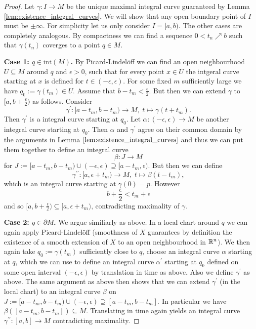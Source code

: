 \begin{proof}
Let $\gamma \colon I \to M$ be the unique maximal integral curve guaranteed by Lemma \ref{lem:existence_integral_curves}. We will show that any open boundary point of $I$ must be $\pm \infty$. For simplicity let us only consider $I = [a,b)$. The other cases are completely analogous. By compactness we can find a sequence $0 < t_n \nearrow b$ such that $\gamma(t_n)$ coverges to a point $q \in M$.

\noindent \textbf{Case 1: $q \in \mathrm{int}(M)$.} By Picard-Lindelöff we can find an open neighbourhood $U \subseteq M$ around $q$ and $\epsilon > 0$, such that for every point $x \in U$ the intgeral curve starting at $x$ is defined for $t \in (-\epsilon,\epsilon)$. For some fixed $m$ sufficiently large we have $q_0 := \gamma(t_m) \in U$. Assume that $b - t_m < \frac{\epsilon}{2}$. But then we can extend $\gamma$ to $[a,b + \frac{\epsilon}{2})$ as follows. Consider
\[
\gamma^\prime \colon [a-t_m,b-t_m) \to M, \; t \mapsto \gamma(t + t_m).
\]
Then $\gamma^\prime$ is a integral curve starting at $q_0$. Let $\alpha \colon (-\epsilon,\epsilon) \to M$ be another integral curve starting at $q_0$. Then $\alpha$ and $\gamma^\prime$ agree on their common domain by the arguments in Lemma $\ref{lem:existence_integral_curves}$ and thus we can put them together to define an integral curve 
\[
\beta \colon J \to M
\]
for $J := [a-t_m,b-t_m) \cup (-\epsilon,\epsilon) \supseteq [a-t_m,\epsilon)$. But then we can define
\[
\gamma^{\prime\prime} \colon [a,\epsilon + t_m) \to M, \; t \mapsto \beta(t-t_m),
\]
which is an integral curve starting at $\gamma(0) = p$. However
\[
b + \frac{\epsilon}{2} < t_m + \epsilon
\]
and so $[a,b + \frac{\epsilon}{2}) \subseteq [a,\epsilon + t_m)$, contradicting maximality of $\gamma$.

\noindent \textbf{Case 2: $q \in \partial M$.} We argue similiarly as above. In a local chart around $q$ we can again apply Picard-Lindelöff (smoothness of $X$ guarantees by definition the existence of a smooth extension of $X$ to an open neighbourhood in $\mathbb{R}^n$). We then again take $q_0 := \gamma(t_m)$ sufficiently close to $q$, choose an integral curve $\alpha$ starting at $q$, which we can use to define an integral curve $\alpha^\prime$ starting at $q_0$ defined on some open interval $(-\epsilon,\epsilon) $ by translation in time as above. Also we define $\gamma^\prime$ as above. The same argument as above then shows that we can extend $\gamma^\prime$ (in the local chart) to an integral curve $\beta$ on $J := [a-t_m,b-t_m) \cup (-\epsilon,\epsilon) \supseteq [a-t_m,b-t_m]$. In particular we have $\beta([a-t_m,b-t_m]) \subseteq M$. Translating in time again yields an integral curve $\gamma^{\prime\prime} \colon [a,b] \to M$ contradicting maximality.
\end{proof}

